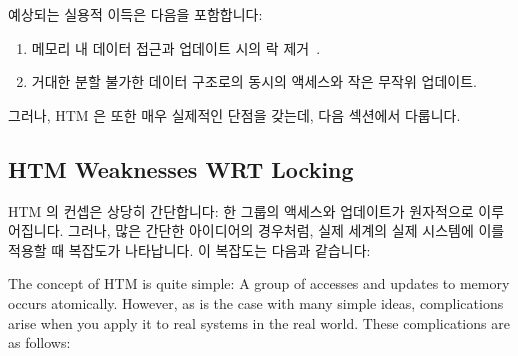 예상되는 실용적 이득은 다음을 포함합니다:

\iffalse

Some evidence of HTM's practical value has been demonstrated in a number
of hardware platforms, including
Sun Rock~\cite{DaveDice2009ASPLOSRockHTM},
Azul Vega~\cite{CliffClick2009AzulHTM},
IBM Blue Gene/Q~\cite{RickMerrit2011PowerTM},
Intel Haswell TSX~\cite{RaviRajwar2012TSX}, and
IBM System z~\cite{ChristianJacobi2012MainframeTM}.

Expected practical benefits include:

\fi

\begin{enumerate}
\item	메모리 내 데이터 접근과 업데이트 시의 락
	제거~\cite{Martinez01a,Rajwar02a}.
\item	거대한 분할 불가한 데이터 구조로의 동시의 액세스와 작은 무작위
	업데이트.

\iffalse

\item	Lock elision for in-memory data access and
	update~\cite{Martinez01a,Rajwar02a}.
\item	Concurrent access and small random updates to large non-partitionable
	data structures.

\fi

\end{enumerate}

그러나, HTM 은 또한 매우 실제적인 단점을 갖는데, 다음 섹션에서 다룹니다.

\iffalse

However, HTM also has some very real shortcomings, which will be discussed
in the next section.

\fi

\subsection{HTM Weaknesses WRT Locking}
\label{sec:future:HTM Weaknesses WRT Locking}

HTM 의 컨셉은 상당히 간단합니다: 한 그룹의 액세스와 업데이트가 원자적으로
이루어집니다.
그러나, 많은 간단한 아이디어의 경우처럼, 실제 세계의 실제 시스템에 이를 적용할
때 복잡도가 나타납니다.
이 복잡도는 다음과 같습니다:

\iffalse

The concept of HTM is quite simple: A group of accesses and updates to
memory occurs atomically.
However, as is the case with many simple ideas, complications arise
when you apply it to real systems in the real world.
These complications are as follows:

